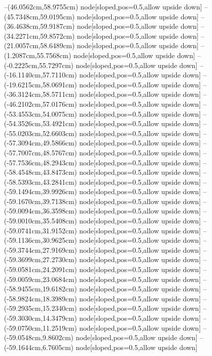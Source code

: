 --(46.0562cm,58.9755cm) node[sloped,pos=0.5,allow upside down]{\arrowIn}
--(45.7348cm,59.0195cm) node[sloped,pos=0.5,allow upside down]{\arrowIn}
--(36.4638cm,59.9187cm) node[sloped,pos=0.5,allow upside down]{\ArrowIn}
--(34.2271cm,59.8572cm) node[sloped,pos=0.5,allow upside down]{\ArrowIn}
--(21.0057cm,58.6489cm) node[sloped,pos=0.5,allow upside down]{\ArrowIn}
--(1.2087cm,55.7568cm) node[sloped,pos=0.5,allow upside down]{\ArrowIn}
--(-0.2225cm,55.7297cm) node[sloped,pos=0.5,allow upside down]{\ArrowIn}
--(-16.1140cm,57.7110cm) node[sloped,pos=0.5,allow upside down]{\ArrowIn}
--(-19.6215cm,58.0691cm) node[sloped,pos=0.5,allow upside down]{\ArrowIn}
--(-36.3124cm,58.5711cm) node[sloped,pos=0.5,allow upside down]{\ArrowIn}
--(-46.2102cm,57.0176cm) node[sloped,pos=0.5,allow upside down]{\ArrowIn}
--(-53.4553cm,54.0075cm) node[sloped,pos=0.5,allow upside down]{\ArrowIn}
--(-54.3526cm,53.4921cm) node[sloped,pos=0.5,allow upside down]{\ArrowIn}
--(-55.0203cm,52.6603cm) node[sloped,pos=0.5,allow upside down]{\ArrowIn}
--(-57.3094cm,49.5866cm) node[sloped,pos=0.5,allow upside down]{\ArrowIn}
--(-57.7007cm,48.5767cm) node[sloped,pos=0.5,allow upside down]{\ArrowIn}
--(-57.7536cm,48.2943cm) node[sloped,pos=0.5,allow upside down]{\arrowIn}
--(-58.4548cm,43.8473cm) node[sloped,pos=0.5,allow upside down]{\ArrowIn}
--(-58.5393cm,43.2841cm) node[sloped,pos=0.5,allow upside down]{\arrowIn}
--(-59.1494cm,39.9926cm) node[sloped,pos=0.5,allow upside down]{\ArrowIn}
--(-59.1670cm,39.7138cm) node[sloped,pos=0.5,allow upside down]{\arrowIn}
--(-59.0094cm,36.3598cm) node[sloped,pos=0.5,allow upside down]{\ArrowIn}
--(-59.0010cm,35.5408cm) node[sloped,pos=0.5,allow upside down]{\arrowIn}
--(-59.0741cm,31.9152cm) node[sloped,pos=0.5,allow upside down]{\ArrowIn}
--(-59.1136cm,30.9625cm) node[sloped,pos=0.5,allow upside down]{\arrowIn}
--(-59.3744cm,27.9169cm) node[sloped,pos=0.5,allow upside down]{\ArrowIn}
--(-59.3699cm,27.2730cm) node[sloped,pos=0.5,allow upside down]{\arrowIn}
--(-59.0581cm,24.2091cm) node[sloped,pos=0.5,allow upside down]{\ArrowIn}
--(-59.0059cm,23.0684cm) node[sloped,pos=0.5,allow upside down]{\ArrowIn}
--(-58.9455cm,19.6182cm) node[sloped,pos=0.5,allow upside down]{\ArrowIn}
--(-58.9824cm,18.3989cm) node[sloped,pos=0.5,allow upside down]{\ArrowIn}
--(-59.2935cm,15.2340cm) node[sloped,pos=0.5,allow upside down]{\ArrowIn}
--(-59.3030cm,14.3479cm) node[sloped,pos=0.5,allow upside down]{\arrowIn}
--(-59.0750cm,11.2519cm) node[sloped,pos=0.5,allow upside down]{\ArrowIn}
--(-59.0548cm,9.8602cm) node[sloped,pos=0.5,allow upside down]{\ArrowIn}
--(-59.1644cm,6.7605cm) node[sloped,pos=0.5,allow upside down]{\ArrowIn}
